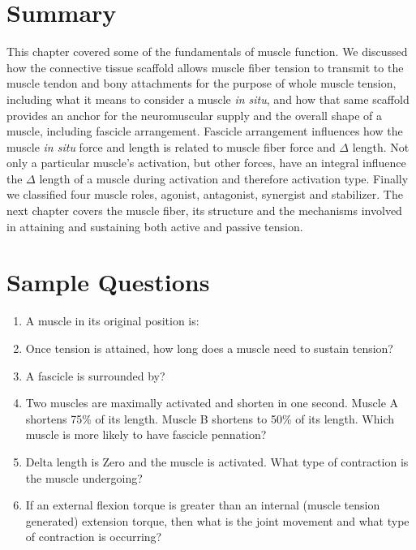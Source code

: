 \section{Summary}

This chapter covered some of the fundamentals of muscle function. We discussed how the connective tissue scaffold allows muscle fiber tension to transmit to the muscle tendon and bony attachments for the purpose of whole muscle tension, including what it means to consider a muscle \textit{in situ}, and how that same scaffold provides an anchor for the neuromuscular supply and the overall shape of a muscle, including fascicle arrangement. Fascicle arrangement influences how the muscle \textit{in situ} force and length is related to muscle fiber force and $\Delta$ length. Not only a particular muscle’s activation, but other forces, have an integral influence the $\Delta$ length of a muscle during activation and therefore activation type. Finally we classified four muscle roles, agonist, antagonist, synergist and stabilizer. The next chapter covers the muscle fiber, its structure and the mechanisms involved in attaining and sustaining both active and passive tension.

\printbibliography[heading=subbibintoc]

\section*{Sample Questions}

\begin{enumerate}
    \item A muscle in its original position is:
    \item Once tension is attained, how long does a muscle need to sustain tension?
    \item A fascicle is surrounded by?
    \item Two muscles are maximally activated and shorten in one second. Muscle A shortens 75\% of its length. Muscle B shortens to 50\% of its length. Which muscle is more likely to have fascicle pennation?
    \item Delta length is Zero and the muscle is activated. What type of contraction is the muscle undergoing?
    \item If an external flexion torque is greater than an internal (muscle tension generated) extension torque, then what is the joint movement and what type of contraction is occurring?
\end{enumerate} 
